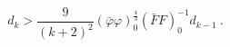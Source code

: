 \begin{equation}
    \label{eq:dcond}
    d_k > \frac{9}{(k+2)^2} (\bar{\varphi} \varphi)_0^{\frac{4}{3}} (\bar{F}
    F)_0^{-1} d_{k-1} \ .
  \end{equation}

